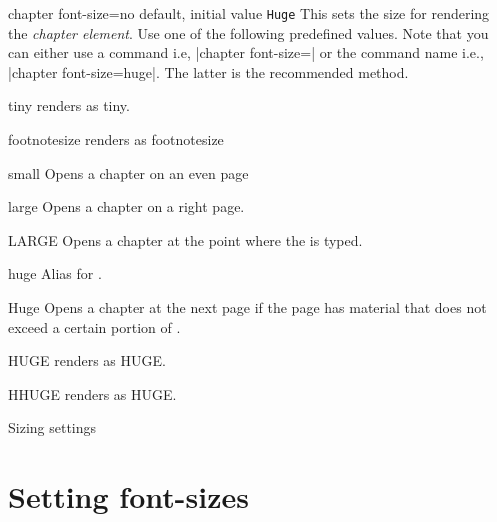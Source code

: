\begin{decription}
\begin{docKey}[phd]{chapter font-size}{=}{no default, initial value \texttt{Huge}}
This sets the size for rendering the \textit{chapter element}. Use one of the following predefined values.
Note that you can either use a command i.e, |chapter font-size=|\cmd{\huge} 
or the command name i.e., |chapter font-size=huge|. The latter is the recommended method.
\end{docKey}

\begin{marglist}
\item [tiny] renders as {\tiny tiny}.
\item[footnotesize] renders as {\footnotesize footnotesize}
\item [small] Opens a chapter on an even page
\item [large] Opens a chapter on a right page.
\item [LARGE] Opens a chapter at the point where the  is typed.
\item [huge] Alias for .
\item [Huge] Opens a chapter at the next page if the page has material that does not exceed a certain portion of
 .
 \item[HUGE] renders as {\HUGE HUGE}.
 \item[HHUGE] renders as {\HHUGE HUGE}.
\end{marglist}

\begin{texexample}{Sizing settings}{}
\chapter{Setting font-sizes}          
\lorem

\end{texexample}





\end{decription}
